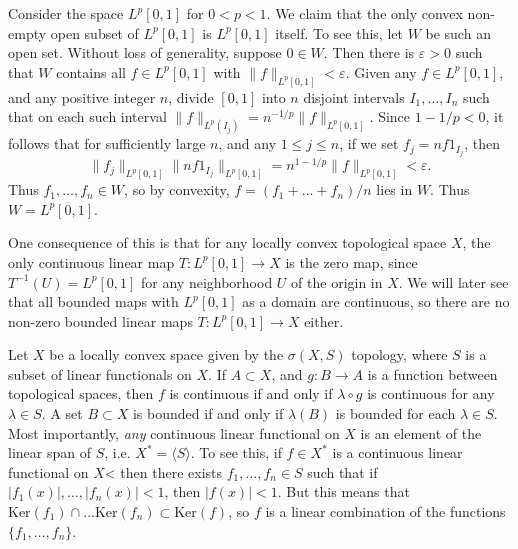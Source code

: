 \begin{example}
    Consider the space $L^p[0,1]$ for $0 < p < 1$. We claim that the only convex non-empty open subset of $L^p[0,1]$ is $L^p[0,1]$ itself. To see this, let $W$ be such an open set. Without loss of generality, suppose $0 \in W$. Then there is $\varepsilon > 0$ such that $W$ contains all $f \in L^p[0,1]$ with $\| f \|_{L^p[0,1]} < \varepsilon$. Given any $f \in L^p[0,1]$, and any positive integer $n$, divide $[0,1]$ into $n$ disjoint intervals $I_1, \dots, I_n$ such that on each such interval $\| f \|_{L^p(I_j)} = n^{-1/p} \| f \|_{L^p[0,1]}$. Since $1 - 1/p < 0$, it follows that for sufficiently large $n$, and any $1 \leq j \leq n$, if we set $f_j = n f 1_{I_j}$, then
    \[ \| f_j \|_{L^p[0,1]} \| n f 1_{I_j} \|_{L^p[0,1]} = n^{1 - 1/p} \| f \|_{L^p[0,1]} < \varepsilon. \]
    Thus $f_1,\dots,f_n \in W$, so by convexity, $f = (f_1 + \dots + f_n) / n$ lies in $W$. Thus $W = L^p[0,1]$.

    One consequence of this is that for any locally convex topological space $X$, the only continuous linear map $T: L^p[0,1] \to X$ is the zero map, since $T^{-1}(U) = L^p[0,1]$ for any neighborhood $U$ of the origin in $X$. We will later see that all bounded maps with $L^p[0,1]$ as a domain are continuous, so there are no non-zero bounded linear maps $T: L^p[0,1] \to X$ either.
\end{example}

\begin{example}
    Let $X$ be a locally convex space given by the $\sigma(X,S)$ topology, where $S$ is a subset of linear functionals on $X$. If $A \subset X$, and $g: B \to A$ is a function between topological spaces, then $f$ is continuous if and only if $\lambda \circ g$ is continuous for any $\lambda \in S$. A set $B \subset X$ is bounded if and only if $\lambda(B)$ is bounded for each $\lambda \in S$. Most importantly, \emph{any} continuous linear functional on $X$ is an element of the linear span of $S$, i.e. $X^* = \langle S \rangle$. To see this, if $f \in X^*$ is a continuous linear functional on $X$< then there exists $f_1,\dots,f_n \in S$ such that if $|f_1(x)|, \dots, |f_n(x)| < 1$, then $|f(x)| < 1$. But this means that $\text{Ker}(f_1) \cap \dots \text{Ker}(f_n) \subset \text{Ker}(f)$, so $f$ is a linear combination of the functions $\{ f_1, \dots, f_n \}$.
\end{example}

